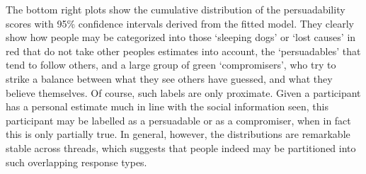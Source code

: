 \documentclass[9pt,a4paper,twocolumn,lineno]{article}
\begin{document}
The bottom right plots show the cumulative distribution of the persuadability scores with 95\% confidence intervals derived from the fitted model. They clearly show how people may be categorized into those ‘sleeping dogs’ or ‘lost causes’ \cite{devriendt2018literature} in red that do not take other peoples estimates into account, the `persuadables' that tend to follow others, and a large group of green `compromisers', who try to strike a balance between what they see others have guessed, and what they believe themselves. Of course, such labels are only proximate. Given a participant has a personal estimate much in line with the social information seen, this participant may be labelled as a persuadable or as a compromiser, when in fact this is only partially true. In general, however, the distributions are remarkable stable across threads, which suggests that people indeed may be partitioned into such overlapping response types.
\end{document}

